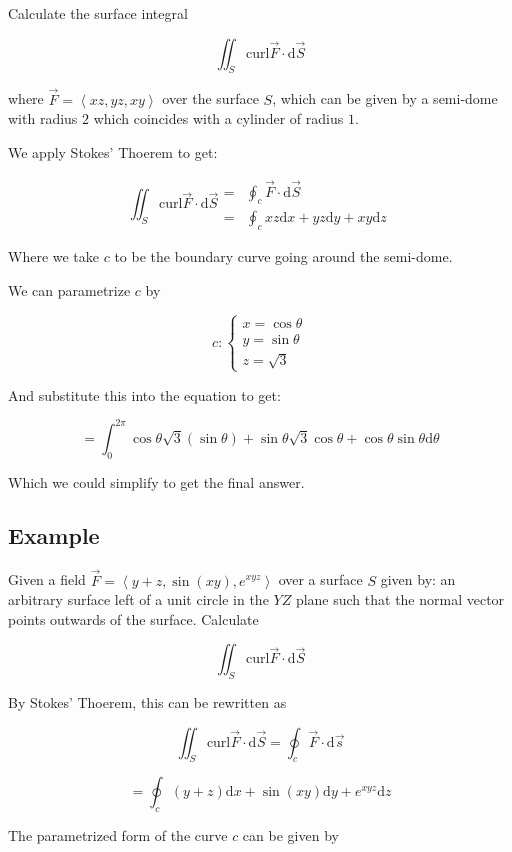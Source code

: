 \documentclass{article}
\newcommand{\D}[1]{\mathrm{d}#1}
\begin{document}
Calculate the surface integral

\[
\iint_S \text{curl} \vec{F} \cdot \D{\vec{S}}
\]

where $\vec{F} = \left<x z, y z, x y\right>$ over the surface $S$, which can be given by a semi-dome with radius $2$ which coincides with a cylinder of radius $1$.

We apply Stokes' Thoerem to get:

\[
\iint_S \text{curl} \vec{F} \cdot \D{\vec{S}} \begin{array}{rl}
  = & \oint_c \vec{F} \cdot \D{\vec{S}} \\
  = & \oint_c x z \D{x} + y z \D{y} + x y \D{z}
\end{array}
\]

Where we take $c$ to be the boundary curve going around the semi-dome.

We can parametrize $c$ by

\[
c: \begin{cases}
  x = \cos{\theta} \\
  y = \sin{\theta} \\
  z = \sqrt{3}
\end{cases}
\]

And substitute this into the equation to get:

\[
= \int_0^{2\pi} \cos{\theta} \sqrt{3} (\sin{\theta}) + \sin{\theta}\sqrt{3} \cos{\theta} + \cos{\theta}\sin{\theta} \D{\theta}
\]

Which we could simplify to get the final answer.

\subsection*{Example}

Given a field $\vec{F} = \left<y + z, \sin{(x y)}, e^{xyz}\right>$ over a surface $S$ given by: an arbitrary surface left of a unit circle in the $Y Z$ plane such that the normal vector points outwards of the surface. Calculate

\[
\iint_S \text{curl} \vec{F} \cdot \D{\vec{S}}
\]

By Stokes' Thoerem, this can be rewritten as

\[
\iint_S \text{curl} \vec{F} \cdot \D{\vec{S}}
=
\oint_c \vec{F} \cdot \D{\vec{s}}
\]

\[
= \oint_c (y + z) \D{x} + \sin(x y) \D{y} + e^{x y z} \D{z}
\]

The parametrized form of the curve $c$ can be given by
\end{document}
